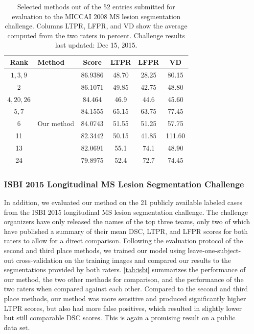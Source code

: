 \begin{table}[tb]
%
\caption[Selected methods out of the 52 entries submitted for evaluation to the
MICCAI 2008 MS lesion segmentation challenge]{Selected methods out of the 52
entries submitted for evaluation to the MICCAI 2008 MS lesion segmentation
challenge. Columns LTPR, LFPR, and VD show the average computed from the two
raters in percent. Challenge results last updated: Dec 15, 2015.}
\label{tab:miccai}
\centering
\begin{tabular}{clS[table-format=2.2]
S[table-format=2.1,round-precision=1]
S[table-format=2.1,round-precision=1]
S[table-format=2.1,round-precision=1]}
\toprule
Rank & Method & {Score} & {LTPR} & {LFPR} & {VD} \\
\midrule
$1,3,9$  & \citet{jesson2015} & 86.9386 & 48.70 & 28.25 & 80.15 \\
2  & \citet{guizard2015}   & 86.1071 & 49.85 & 42.75 & 48.80 \\
$4,20,26$  & \citet{tomas2015} & 84.464 & 46.9 & 44.6 &
45.60 \\
$5,7$ & \citet{jerman2015}        & 84.1555 & 65.15 & 63.75 & 77.45 \\
6  & Our method    & 84.0743 & 51.55 & 51.25 & 57.75 \\
11 & \citet{roura2015} & 82.3442 & 50.15 & 41.85 & 111.60 \\
13 & \citet{geremia2010}     & 82.0691 & 55.1 & 74.1 & 48.90 \\
24 & \citet{shiee2010} & 79.8975 & 52.4 & 72.7 & 74.45 \\
\bottomrule
\end{tabular}
\end{table}

\subsubsection{ISBI 2015 Longitudinal MS Lesion Segmentation Challenge}

In addition, we evaluated our method on the 21 publicly available labeled cases
from the ISBI 2015 longitudinal MS lesion segmentation challenge. The challenge
organizers have only released the names of the top three teams, only two of
which have published a summary of their mean DSC, LTPR, and LFPR scores for both
raters to allow for a direct comparison. Following the evaluation protocol of
the second \citep{jesson2015} and third \citep{maier2015} place methods, we
trained our model using leave-one-subject-out cross-validation on the training
images and compared our results to the segmentations provided by both raters.
\ref{tab:isbi} summarizes the performance of our method, the two other
methods for comparison, and the performance of the two raters when compared
against each other. Compared to the second and third place methods, our method
was more sensitive and produced significantly higher LTPR scores, but also had
more false positives, which resulted in slightly lower but still comparable DSC
scores. This is again a promising result on a public data set.

